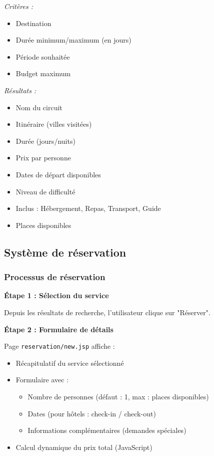 \documentclass[12pt,a4paper]{report}
\begin{document}
\textit{Critères :}
\begin{itemize}
    \item Destination
    \item Durée minimum/maximum (en jours)
    \item Période souhaitée
    \item Budget maximum
\end{itemize}

\textit{Résultats :}
\begin{itemize}
    \item Nom du circuit
    \item Itinéraire (villes visitées)
    \item Durée (jours/nuits)
    \item Prix par personne
    \item Dates de départ disponibles
    \item Niveau de difficulté
    \item Inclus : Hébergement, Repas, Transport, Guide
    \item Places disponibles
\end{itemize}

\subsection{Système de réservation}

\subsubsection{Processus de réservation}

\textbf{Étape 1 : Sélection du service}

Depuis les résultats de recherche, l'utilisateur clique sur "Réserver".

\textbf{Étape 2 : Formulaire de détails}

Page \texttt{reservation/new.jsp} affiche :
\begin{itemize}
    \item Récapitulatif du service sélectionné
    \item Formulaire avec :
    \begin{itemize}
        \item Nombre de personnes (défaut : 1, max : places disponibles)
        \item Dates (pour hôtels : check-in / check-out)
        \item Informations complémentaires (demandes spéciales)
    \end{itemize}
    \item Calcul dynamique du prix total (JavaScript)
\end{itemize}
\end{document}
